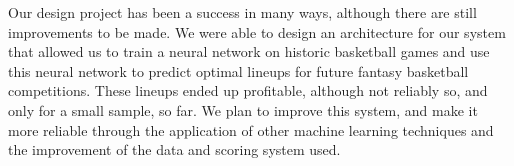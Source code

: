 Our design project has been a success in many ways, although there are still improvements to be made. We were able to design an architecture for our system that allowed us to train a neural network on historic basketball games and use this neural network to predict optimal lineups for future fantasy basketball competitions. These lineups ended up profitable, although not reliably so, and only for a small sample, so far. We plan to improve this system, and make it more reliable through the application of other machine learning techniques and the improvement of the data and scoring system used.
